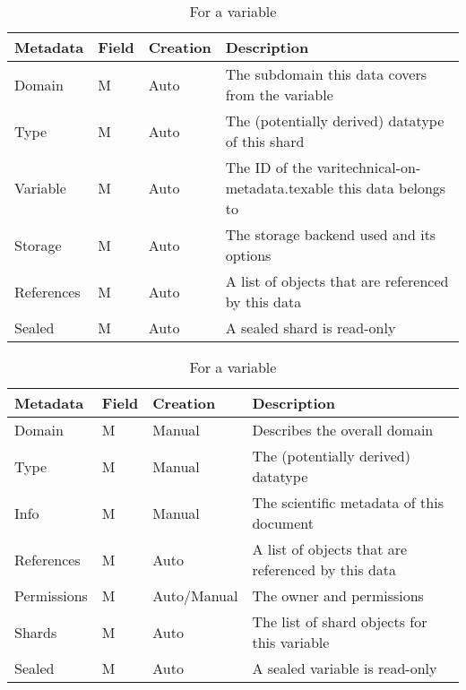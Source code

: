 \begin{table}
	\begin{subtable}[t]{\textwidth}
		\begin{tabular}{llll}
			Metadata & Field & Creation & Description\\
			\hline
			Domain   & M & Auto & The subdomain this data covers from the variable\\
			Type     & M & Auto & The (potentially derived) datatype of this shard\\
			Variable & M & Auto & The ID of the varitechnical-on-metadata.texable this data belongs to\\
			Storage  & M & Auto & The storage backend used and its options\\
			References & M & Auto & A list of objects that are referenced by this data\\
			Sealed   & M & Auto & A sealed shard is read-only\\
		\end{tabular}
		\caption{For a shard}
	\end{subtable}

	\begin{subtable}[t]{\textwidth}
		\begin{tabular}{llll}
			Metadata & Field & Creation & Description\\
			\hline
			Domain      & M & Manual & Describes the overall domain\\
			Type   	    & M & Manual & The (potentially derived) datatype\\
			Info   	    & M & Manual & The scientific metadata of this document\\
			References  & M & Auto & A list of objects that are referenced by this data\\
			Permissions & M & Auto/Manual & The owner and permissions \\
			Shards      & M & Auto & The list of shard objects for this variable\\
			Sealed      & M & Auto & A sealed variable is read-only\\
		\end{tabular}
		\caption{For a variable}
	\end{subtable}



\end{table}
